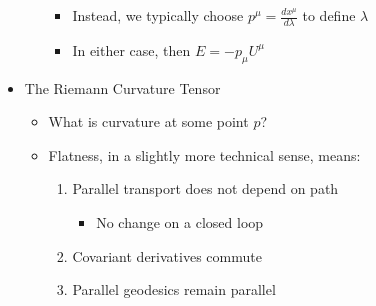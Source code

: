 \begin{itemize}
\begin{itemize}
        \begin{itemize}

          \item Instead, we typically choose $p^{\mu}=\frac{dx^{\mu}}{d\lambda}$ to define $\lambda$

          \item In either case, then $E=-p_{\mu}U^{\mu}$

        \end{itemize}

    \end{itemize}

  \item The Riemann Curvature Tensor

    \begin{itemize}

      \item What is curvature at some point $p$?

      \item Flatness, in a slightly more technical sense, means:

        \begin{enumerate}

          \item Parallel transport does not depend on path

            \begin{itemize}

              \item No change on a closed loop

            \end{itemize}

          \item Covariant derivatives commute

          \item Parallel geodesics remain parallel

        \end{enumerate}

    \end{itemize}

\end{itemize}



